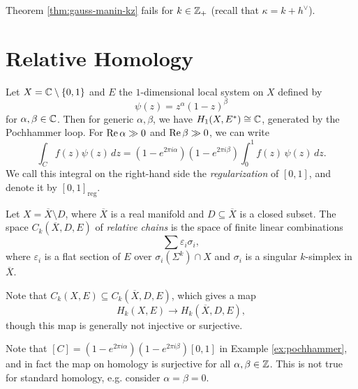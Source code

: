 \begin{remark}
  Theorem \ref{thm:gauss-manin-kz}
  fails for $k \in \mathbb{Z}_+$
  (recall that $\kappa = k + h^\vee$).
\end{remark}

\section{Relative Homology}

\begin{example}\label{ex:pochhammer}
  Let $X = \mathbb{C} \setminus \{0, 1\}$ and
  $E$ the $1$-dimensional local system
  on $X$ defined by
  \[
    \psi(z) = z^\alpha(1 - z)^\beta
  \]
  for $\alpha, \beta \in \mathbb{C}$. Then for
  generic $\alpha, \beta$, we have
  $H_1(X, E^*) \cong \mathbb{C}$, generated
  by the Pochhammer loop.
  For $\operatorname{Re} \alpha \gg 0$
  and $\operatorname{Re} \beta \gg 0$, we can write
  \[
    \int_C f(z) \psi(z)\, dz
    = (1 - e^{2\pi i \alpha})(1 - e^{2\pi i \beta})
    \int_0^1 f(z)\, \psi(z)\, dz.
  \]
  We call this integral on the right-hand side
  the \emph{regularization} of $[0, 1]$,
  and denote it
  by $[0, 1]_{\mathrm{reg}}$.
\end{example}

\begin{definition}
  Let $X = \overline{X} \setminus D$,
  where $\overline{X}$ is a real manifold
  and $D \subseteq \overline{X}$ is a
  closed subset.
  The space
  $C_k(\overline{X}, D, E)$ of
  \emph{relative chains}
  is the space of finite linear combinations
  \[
    \sum \varepsilon_i \sigma_i,
  \]
  where $\varepsilon_i$ is a
  flat section of $E$ over
  $\sigma_i(\Sigma^k) \cap X$ and
  $\sigma_i$ is a singular $k$-simplex
  in $\overline{X}$.
\end{definition}

\begin{remark}
  Note that
  $C_k(X, E) \subseteq C_k(\overline{X}, D, E)$,
  which gives a map
  \[
    H_k(X, E)
    \longrightarrow H_k(\overline{X}, D, E),
    \tag{$*$}
  \]
  though this map is
  generally not injective or surjective.
\end{remark}

\begin{example}
  Note that
  $[C] = (1 - e^{2\pi i \alpha})(1 - e^{2\pi i \beta}) [0, 1]$
  in Example \ref{ex:pochhammer}, and
  in fact the map on homology is surjective
  for all $\alpha, \beta \in \mathbb{Z}$.
  This is not true for standard homology,
  e.g. consider $\alpha = \beta = 0$.
\end{example}

